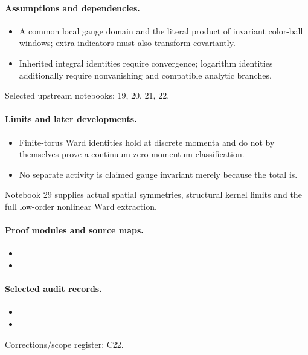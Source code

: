 \documentclass[11pt]{article}
\theoremstyle{remark}
\begin{document}
\paragraph{Assumptions and dependencies.}
\begin{itemize}
\item A common local gauge domain and the literal product of invariant color-ball windows; extra indicators must also transform covariantly.
\item Inherited integral identities require convergence; logarithm identities additionally require nonvanishing and compatible analytic branches.
\end{itemize}

Selected upstream notebooks: 19, 20, 21, 22.\par

\paragraph{Limits and later developments.}
\begin{itemize}
\item Finite-torus Ward identities hold at discrete momenta and do not by themselves prove a continuum zero-momentum classification.
\item No separate activity is claimed gauge invariant merely because the total is.
\end{itemize}

Notebook 29 supplies actual spatial symmetries, structural kernel limits and the full low-order nonlinear Ward extraction.

\paragraph{Proof modules and source maps.}
\begingroup\small
\begin{itemize}
\item {}
\item {}
\end{itemize}
\endgroup

\paragraph{Selected audit records.}
\begingroup\small
\begin{itemize}
\item {}
\item {}
\end{itemize}
\endgroup
Corrections/scope register: C22.\par
\end{document}
